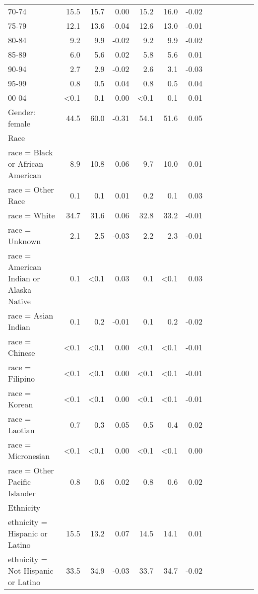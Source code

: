 \documentclass[11pt,]{article}
\begin{document}
\begin{longtable}{lrrrrrrrrrrrr}
      70-74 & 15.5 & 15.7 &  0.00 & 15.2 & 16.0 & -0.02 \\ 
      75-79 & 12.1 & 13.6 & -0.04 & 12.6 & 13.0 & -0.01 \\ 
      80-84 &  9.2 &  9.9 & -0.02 &  9.2 &  9.9 & -0.02 \\ 
      85-89 &  6.0 &  5.6 &  0.02 &  5.8 &  5.6 &  0.01 \\ 
      90-94 &  2.7 &  2.9 & -0.02 &  2.6 &  3.1 & -0.03 \\ 
      95-99 &  0.8 &  0.5 &  0.04 &  0.8 &  0.5 &  0.04 \\ 
      00-04 & <0.1 &  0.1 &  0.00 & <0.1 &  0.1 & -0.01 \\ 
  Gender: female & 44.5 & 60.0 & -0.31 & 54.1 & 51.6 &  0.05 \\ 
  Race &    &    &     &    &    &     \\ 
      race = Black or African American &  8.9 & 10.8 & -0.06 &  9.7 & 10.0 & -0.01 \\ 
      race = Other Race &  0.1 &  0.1 &  0.01 &  0.2 &  0.1 &  0.03 \\ 
      race = White & 34.7 & 31.6 &  0.06 & 32.8 & 33.2 & -0.01 \\ 
      race = Unknown &  2.1 &  2.5 & -0.03 &  2.2 &  2.3 & -0.01 \\ 
      race = American Indian or Alaska Native &  0.1 & <0.1 &  0.03 &  0.1 & <0.1 &  0.03 \\ 
      race = Asian Indian &  0.1 &  0.2 & -0.01 &  0.1 &  0.2 & -0.02 \\ 
      race = Chinese & <0.1 & <0.1 &  0.00 & <0.1 & <0.1 & -0.01 \\ 
      race = Filipino & <0.1 & <0.1 &  0.00 & <0.1 & <0.1 & -0.01 \\ 
      race = Korean & <0.1 & <0.1 &  0.00 & <0.1 & <0.1 & -0.01 \\ 
      race = Laotian &  0.7 &  0.3 &  0.05 &  0.5 &  0.4 &  0.02 \\ 
      race = Micronesian & <0.1 & <0.1 &  0.00 & <0.1 & <0.1 &  0.00 \\ 
      race = Other Pacific Islander &  0.8 &  0.6 &  0.02 &  0.8 &  0.6 &  0.02 \\ 
  Ethnicity &    &    &     &    &    &     \\ 
      ethnicity = Hispanic or Latino & 15.5 & 13.2 &  0.07 & 14.5 & 14.1 &  0.01 \\ 
      ethnicity = Not Hispanic or Latino & 33.5 & 34.9 & -0.03 & 33.7 & 34.7 & -0.02 \\ 

\end{longtable}
\end{document}
